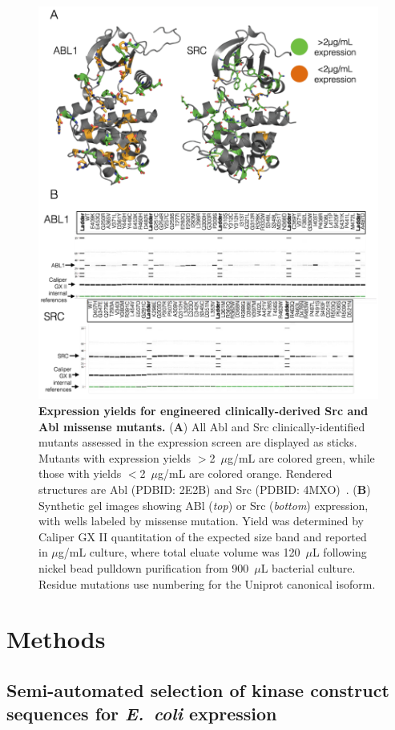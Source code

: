 \documentclass[phd,tocprelim]{cornell}
\begin{document}
\begin{landscape}
	\begin{figure}[p]
		\centering
		\includegraphics[width=0.5\linewidth]{figures/96-mutants-finalfigure.pdf}
		\caption[Expression yields for engineered clinically-derived Src and Abl missense mutants]{{\bf Expression yields for engineered clinically-derived Src and Abl missense mutants.}
			({\bf A}) All Abl and Src clinically-identified mutants assessed in the expression screen are displayed as sticks. 
			Mutants with expression yields $>$2~$\mu$g/mL are colored green, while those with yields $<$2~$\mu$g/mL are colored orange. 
			Rendered structures are Abl (PDBID: 2E2B) and Src (PDBID: 4MXO)~\citep{Levinson:2014gi}.
			({\bf B}) Synthetic gel images showing ABl (\emph{top}) or Src (\emph{bottom}) expression, with wells labeled by missense mutation.  
			Yield  was determined by Caliper GX II quantitation of the expected size band and reported in $\mu$g/mL culture, where total eluate volume was 120~$\mu$L following nickel bead pulldown purification from 900~$\mu$L bacterial culture.
			Residue mutations use numbering for the Uniprot canonical isoform.}
		\label{fig:96-mutant-fig}
	\end{figure}
\end{landscape}

\section{Methods}

\subsection{Semi-automated selection of kinase construct sequences for \emph{E.~coli} expression}
\end{document}
